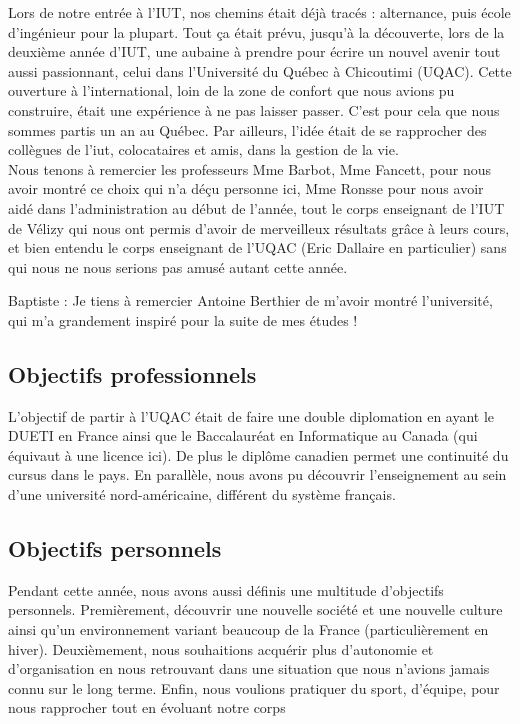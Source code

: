 Lors de notre entrée à l'IUT, nos chemins était déjà tracés : alternance, puis école d'ingénieur pour la plupart. Tout ça était prévu, jusqu'à la découverte, lors de la deuxième année d'IUT, une aubaine à prendre pour écrire un nouvel avenir tout aussi passionnant, celui dans l'Université du Québec à Chicoutimi (UQAC). Cette ouverture à l'international, loin de la zone de confort que nous avions pu construire, était une expérience à ne pas laisser passer. C'est pour cela que nous sommes partis un an au Québec.
Par ailleurs, l'idée était de se rapprocher des collègues de l'iut, colocataires et amis, dans la gestion de la vie.\\

Nous tenons à remercier les professeurs Mme Barbot, Mme Fancett, pour nous avoir montré ce choix qui n'a déçu personne ici, Mme Ronsse pour nous avoir aidé dans l'administration au début de l'année, tout le corps enseignant de l'IUT de Vélizy qui nous ont permis d'avoir de merveilleux résultats grâce à leurs cours, et bien entendu le corps enseignant de l'UQAC (Eric Dallaire en particulier) sans qui nous ne nous serions pas amusé autant cette année.

Baptiste : Je tiens à remercier Antoine Berthier de m'avoir montré l'université, qui m'a grandement inspiré pour la suite de mes études !

\subsection{Objectifs professionnels}

L'objectif de partir à l'UQAC était de faire une double diplomation en ayant le DUETI en France ainsi que le Baccalauréat en Informatique au Canada (qui équivaut à une licence ici). De plus le diplôme canadien permet une continuité du cursus dans le pays. En parallèle, nous avons pu découvrir l'enseignement au sein d'une université nord-américaine, différent du système français.

\subsection{Objectifs personnels}

Pendant cette année, nous avons aussi définis une multitude d'objectifs personnels.
Premièrement, découvrir une nouvelle société et une nouvelle culture ainsi qu'un environnement variant beaucoup de la France (particulièrement en hiver). 
Deuxièmement, nous souhaitions acquérir plus d'autonomie et d'organisation en nous retrouvant dans une situation que nous n'avions jamais connu sur le long terme.
Enfin, nous voulions pratiquer du sport, d'équipe, pour nous rapprocher tout en évoluant notre corps

